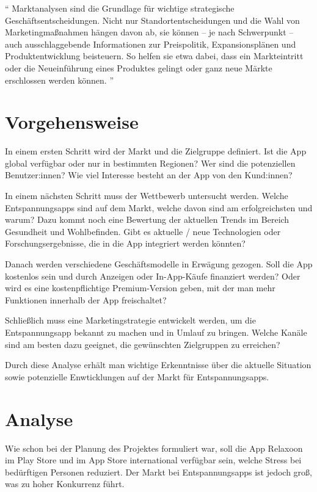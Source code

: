 "`
Marktanalysen sind die Grundlage für wichtige strategische Geschäftsentscheidungen. 
Nicht nur Standortentscheidungen und die Wahl von Marketingmaßnahmen hängen davon ab, sie können – je nach 
Schwerpunkt – auch ausschlaggebende Informationen zur Preispolitik, Expansionsplänen und Produktentwicklung 
beisteuern. So helfen sie etwa dabei, dass ein Markteintritt oder die Neueinführung eines Produktes gelingt
oder ganz neue Märkte erschlossen werden können. 
"'
\cite{marktanalyse}

\section{Vorgehensweise}

In einem ersten Schritt wird der Markt und die Zielgruppe definiert. 
Ist die App global verfügbar oder nur in bestimmten Regionen? Wer sind die potenziellen Benutzer:innen?
Wie viel Interesse besteht an der App von den Kund:innen?

In einem nächsten Schritt muss der Wettbewerb untersucht werden.
Welche Entspannungsapps sind auf dem Markt, welche davon sind am erfolgreichsten und warum?
Dazu kommt noch eine Bewertung der aktuellen Trends im Bereich Gesundheit und Wohlbefinden. 
Gibt es aktuelle / neue Technologien oder Forschungsergebnisse, die in die App integriert werden könnten?

Danach werden verschiedene Geschäftsmodelle in Erwägung gezogen. 
Soll die App kostenlos sein und durch Anzeigen oder In-App-Käufe finanziert werden? 
Oder wird es eine kostenpflichtige Premium-Version geben, mit der man mehr Funktionen innerhalb der App freischaltet?

Schließlich muss eine Marketingstrategie entwickelt werden, um die Entspannungsapp bekannt zu machen und
in Umlauf zu bringen. 
Welche Kanäle sind am besten dazu geeignet, die gewünschten Zielgruppen zu erreichen?



Durch diese Analyse erhält man wichtige Erkenntnisse über die aktuelle Situation sowie potenzielle Enwticklungen
auf der Markt für Entspannungsapps.


\section{Analyse}

Wie schon bei der Planung des Projektes formuliert war, soll die App Relaxoon im Play Store und im App Store 
international verfügbar sein, welche Stress bei bedürftigen Personen reduziert. Der Markt bei Entspannungsapps
ist jedoch groß, was zu hoher Konkurrenz führt. 

